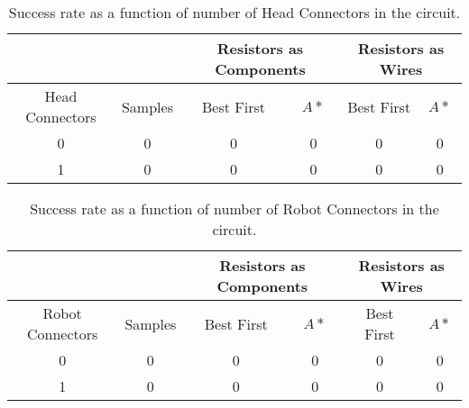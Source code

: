 \begin{table}[H]
\begin{center}
\begin{singlespace}
\begin{tabular}{| c | c || c | c | c | c |}
\hline
 & & \multicolumn{2}{|c|}{Resistors as Components} & \multicolumn{2}{|c|}{
 Resistors as Wires} \\
\hline
Head Connectors & Samples & Best First & $A*$ & Best First & $A*$ \\
\hline\hline
0 & 0 & 0 & 0 & 0 & 0 \\
1 & 0 & 0 & 0 & 0 & 0 \\
\hline
\end{tabular}
\end{singlespace}
\end{center}
\caption{Success rate as a function of number of Head Connectors in the circuit.}
\end{table}

\begin{table}[H]
\begin{center}
\begin{singlespace}
\begin{tabular}{| c | c || c | c | c | c |}
\hline
 & & \multicolumn{2}{|c|}{Resistors as Components} & \multicolumn{2}{|c|}{
 Resistors as Wires} \\
\hline
Robot Connectors & Samples & Best First & $A*$ & Best First & $A*$ \\
\hline\hline
0 & 0 & 0 & 0 & 0 & 0 \\
1 & 0 & 0 & 0 & 0 & 0 \\
\hline
\end{tabular}
\end{singlespace}
\end{center}
\caption{Success rate as a function of number of Robot Connectors in the circuit.}
\end{table}
